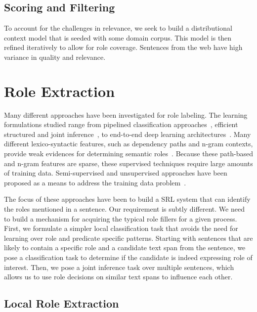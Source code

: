 \subsection{Scoring and Filtering}

To account for the challenges in relevance, we seek to build a distributional context model that is seeded with some domain corpus. This model is then refined iteratively to allow for role coverage. 
Sentences from the web have high variance in quality and relevance. 

\section{Role Extraction}

Many different approaches have been investigated for role labeling.
The learning formulations studied range from pipelined classification approaches~\cite{gildea2002automatic,bjorkelund2009multilingual}, 
efficient structured and joint inference~\cite{koomen2005generalized,tackstrom2015efficient}, to end-to-end deep learning architectures~\cite{foland2015dependency}.
Many different lexico-syntactic features, such as dependency paths and n-gram contexts, provide weak evidences for determining semantic roles~\cite{gildea2002automatic}. 
Because these path-based and n-gram features are sparse, these supervised techniques require large amounts of training data. 
Semi-supervised and unsupervised approaches have been proposed as a means to address the training data problem~\cite{furstenau-emnlp2009,klementievsemi}.

The focus of these approaches have been to build a SRL system that can identify the roles mentioned in a sentence. 
Our requirement is subtly different. We need to build a mechanism for acquiring the typical role fillers for a given process. 
First, we formulate a simpler local classification task that avoids the need for learning over role and predicate specific patterns. 
Starting with sentences that are likely to contain a specific role and a candidate text span from the sentence, 
we pose a classification task to determine if the candidate  is indeed expressing role of interest. 
Then, we pose a joint inference task over multiple sentences, which allows us to use role decisions on similar 
text spans to influence each other. 

\subsection{Local Role Extraction}


